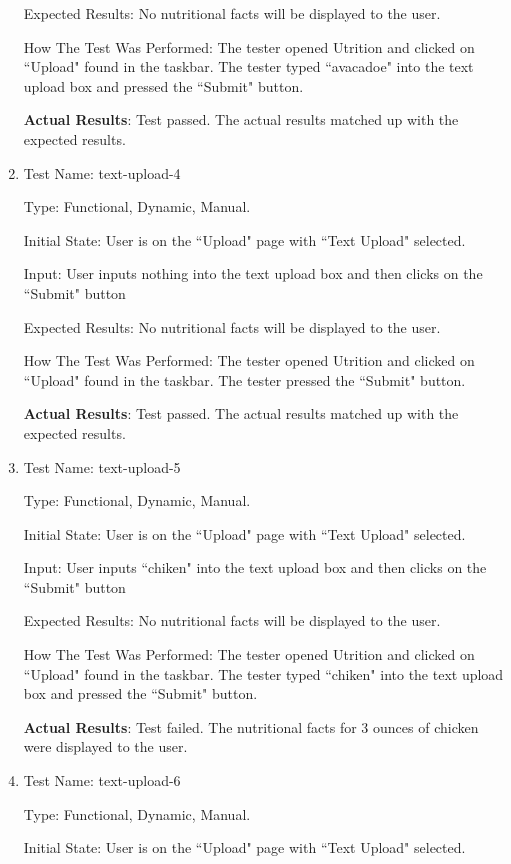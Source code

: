 \documentclass[12pt, titlepage]{article}
\begin{document}
\begin{enumerate}
		Expected Results: No nutritional facts will be displayed to the user.
		
		How The Test Was Performed: The tester opened Utrition and clicked on ``Upload" found in the taskbar. The tester typed ``avacadoe" into the text upload box and pressed the ``Submit" button.
		
		\textbf{Actual Results}: Test passed. The actual results matched up with the expected results.
		
		\item{Test Name: text-upload-4}
		
		Type: Functional, Dynamic, Manual.
		
		Initial State: User is on the ``Upload" page with ``Text Upload" selected.
		
		Input: User inputs nothing into the text upload box and then clicks on the ``Submit" button
		
		Expected Results: No nutritional facts will be displayed to the user.
		
		How The Test Was Performed: The tester opened Utrition and clicked on ``Upload" found in the taskbar. The tester pressed the ``Submit" button.
		
		\textbf{Actual Results}: Test passed. The actual results matched up with the expected results.
	
		\item{Test Name: text-upload-5}
		
		Type: Functional, Dynamic, Manual.
		
		Initial State: User is on the ``Upload" page with ``Text Upload" selected.
		
		Input: User inputs ``chiken" into the text upload box and then clicks on the ``Submit" button
		
		Expected Results: No nutritional facts will be displayed to the user.
		
		How The Test Was Performed: The tester opened Utrition and clicked on ``Upload" found in the taskbar. The tester typed ``chiken" into the text upload box and pressed the ``Submit" button.
		
		\textbf{Actual Results}: Test failed. The nutritional facts for 3 ounces of chicken were displayed to the user.
		
		\item{Test Name: text-upload-6}
		
		Type: Functional, Dynamic, Manual.
		
		Initial State: User is on the ``Upload" page with ``Text Upload" selected.
		

\end{enumerate}
\end{document}
